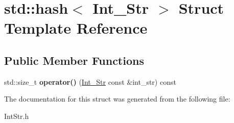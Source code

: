 \hypertarget{structstd_1_1hash_3_01Int__Str_01_4}{}\section{std\+:\+:hash$<$ Int\+\_\+\+Str $>$ Struct Template Reference}
\label{structstd_1_1hash_3_01Int__Str_01_4}
\subsection*{Public Member Functions}
\begin{DoxyCompactItemize}
\item 
\mbox{\label{structstd_1_1hash_3_01Int__Str_01_4_a062dbfce81acd0b62b8aabb675288372}} 
std\+::size\+\_\+t {\bfseries operator()} (\hyperlink{classInt__Str}{Int\+\_\+\+Str} const \&int\+\_\+str) const
\end{DoxyCompactItemize}


The documentation for this struct was generated from the following file\+:\begin{DoxyCompactItemize}
\item 
Int\+Str.\+h\end{DoxyCompactItemize}
